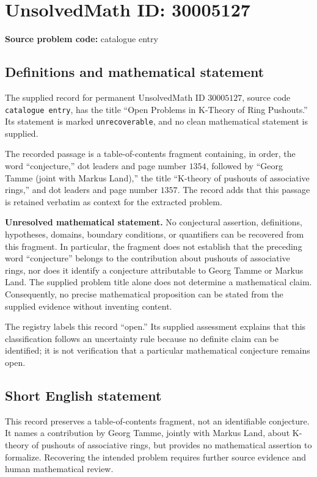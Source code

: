 \documentclass[11pt]{article}
\begin{document}
\section*{UnsolvedMath ID: 30005127}
\textbf{Source problem code:} catalogue entry
\subsection{Definitions and mathematical statement}
The supplied record for permanent UnsolvedMath ID \(30005127\), source code \texttt{catalogue entry}, has the title ``Open Problems in K-Theory of Ring Pushouts.'' Its statement is marked \texttt{unrecoverable}, and no clean mathematical statement is supplied.

The recorded passage is a table-of-contents fragment containing, in order, the word ``conjecture,'' dot leaders and page number \(1354\), followed by ``Georg Tamme (joint with Markus Land),'' the title ``K-theory of pushouts of associative rings,'' and dot leaders and page number \(1357\). The record adds that this passage is retained verbatim as context for the extracted problem.

\textbf{Unresolved mathematical statement.} No conjectural assertion, definitions, hypotheses, domains, boundary conditions, or quantifiers can be recovered from this fragment. In particular, the fragment does not establish that the preceding word ``conjecture'' belongs to the contribution about pushouts of associative rings, nor does it identify a conjecture attributable to Georg Tamme or Markus Land. The supplied problem title alone does not determine a mathematical claim. Consequently, no precise mathematical proposition can be stated from the supplied evidence without inventing content.

The registry labels this record ``open.'' Its supplied assessment explains that this classification follows an uncertainty rule because no definite claim can be identified; it is not verification that a particular mathematical conjecture remains open.
\subsection{Short English statement}
This record preserves a table-of-contents fragment, not an identifiable conjecture. It names a contribution by Georg Tamme, jointly with Markus Land, about K-theory of pushouts of associative rings, but provides no mathematical assertion to formalize. Recovering the intended problem requires further source evidence and human mathematical review.
\end{document}

